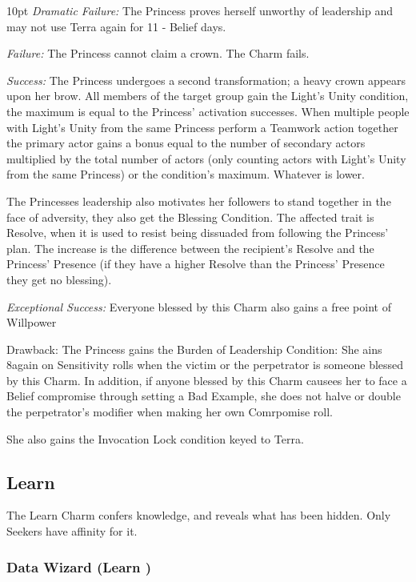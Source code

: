 \begin{myindentpar}{10pt}    \emph{Dramatic Failure:} The Princess proves herself unworthy of leadership and may not use Terra again for 11 - Belief days. 

    \emph{Failure:} The Princess cannot claim a crown. The Charm fails.

    \emph{Success:} The Princess undergoes a second transformation; a heavy crown appears upon her brow. All members of the target group gain the Light's Unity condition, the maximum is equal to the Princess' activation successes. When multiple people with Light's Unity from the same Princess perform a Teamwork action together the primary actor gains a bonus equal to the number of secondary actors multiplied by the total number of actors (only counting actors with Light's Unity from the same Princess) or the condition's maximum. Whatever is lower. 
    
    The Princesses leadership also motivates her followers to stand together in the face of adversity, they also get the Blessing Condition. The affected trait is Resolve, when it is used to resist being dissuaded from following the Princess' plan. The increase is the difference between the recipient’s Resolve and the Princess' Presence (if they have a higher Resolve than the Princess' Presence they get no blessing). 

    \emph{Exceptional Success:} Everyone blessed by this Charm also gains a free point of Willpower\end{myindentpar}

\noindent Drawback: The Princess gains the Burden of Leadership Condition: She ains 8again on Sensitivity rolls when the victim or the perpetrator is someone blessed by this Charm. In addition, if anyone blessed by this Charm causees her to face a Belief compromise through setting a Bad Example, she does not halve or double the perpetrator's modifier when making her own Comrpomise roll.

She also gains the Invocation Lock condition keyed to Terra. 

\subsection*{Learn}
The Learn Charm confers knowledge, and reveals what has been hidden. Only Seekers have affinity for it.

\subsubsection*{Data Wizard (Learn \textbullet)}

